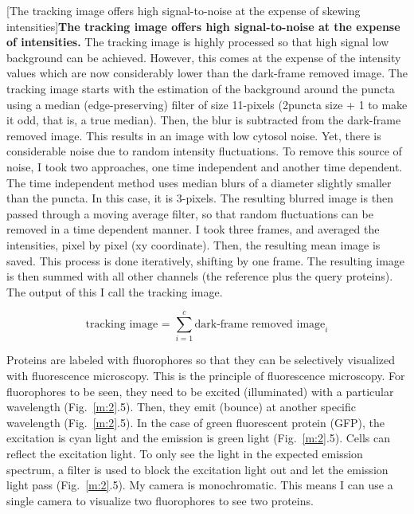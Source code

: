 \begin{centering}
\captionsetup{parbox=none}
[The tracking image offers high signal-to-noise at the expense of skewing intensities]{\textbf{The tracking image offers high signal-to-noise at the expense of intensities.} The tracking image is highly processed so that high signal low background can be achieved. However, this comes at the expense of the intensity values which are now considerably lower than the dark-frame removed image. The tracking image starts with the estimation of the background around the puncta using a median (edge-preserving) filter of size 11-pixels (2\times puncta size + 1 to make it odd, that is, a true median). Then, the blur is subtracted from the dark-frame removed image. This results in an image with low cytosol noise. Yet, there is considerable noise due to random intensity fluctuations. To remove this source of noise, I took two approaches, one time independent and another time dependent. The time independent method uses median blurs of a diameter slightly smaller than the puncta. In this case, it is 3-pixels. The resulting blurred image is then passed through a moving average filter, so that random fluctuations can be removed in a time dependent manner. I took three frames, and averaged the intensities, pixel by pixel (xy coordinate). Then, the resulting mean image is saved. This process is done iteratively, shifting by one frame. The resulting image is then summed with all other channels (the reference plus the query proteins). The output of this I call the tracking image.}
\label{m:S2}
\end{centering}

\begin{equation*}
\text{tracking image = }\sum_{i = 1}^{c}\text{dark-frame removed image}_i
\end{equation*}

Proteins are labeled with fluorophores so that they can be selectively visualized with fluorescence microscopy. This is the principle of fluorescence microscopy. For fluorophores to be seen, they need to be excited (illuminated) with a particular wavelength (Fig.~\ref{m:2}.5). Then, they emit (bounce) at another specific wavelength (Fig.~\ref{m:2}.5). In the case of green fluorescent protein (GFP), the excitation is cyan light and the emission is green light (Fig.~\ref{m:2}.5). Cells can reflect the excitation light. To only see the light in the expected emission spectrum, a filter is used to block the excitation light out and let the emission light pass (Fig.~\ref{m:2}.5). My camera is monochromatic. This means I can use a single camera to visualize two fluorophores to see two proteins.

